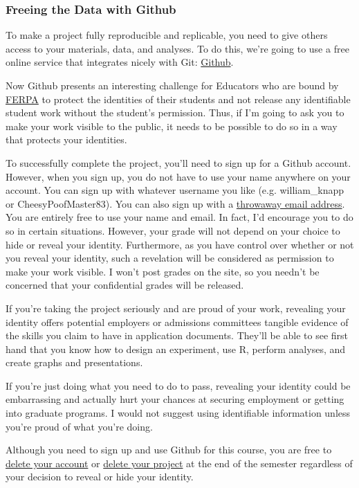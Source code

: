 \documentclass[12pt]{article}
\begin{document}
\subsubsection{Freeing the Data with Github}
To make a project fully reproducible and replicable, you need to give others access to your materials,
data, and analyses. To do this, we're going to use a free online service that integrates nicely with
Git: \href{https://github.com/}{Github}.

Now Github presents an interesting challenge for Educators who are bound by
\href{http://www2.ed.gov/policy/gen/guid/fpco/ferpa/index.html}{FERPA} to protect the identities
of their students and not release any identifiable student work without the student's permission.
Thus, if I'm going to ask you to make your work visible to the public, it needs to be possible
to do so in a way that protects your identities.

To successfully complete the project, you'll need to sign up for a Github account. However, when
you sign up, you do not have to use your name anywhere on your account. You can sign up with
whatever username you like (e.g. william\_knapp or CheesyPoofMaster83). You can also sign up with a
\href{http://www.throwawaymail.com/}{throwaway email address}. You are entirely free to use your
name and email. In fact, I'd encourage you to do so in certain situations. However, your grade
will not depend on your choice to hide or reveal your identity. Furthermore, as you have control
over whether or not you reveal your identity, such a revelation will be considered as permission
to make your work visible. I won't post grades on the site, so you needn't be concerned that
your confidential grades will be released.

If you're taking the project seriously and are proud of your work, revealing your identity offers
potential employers or admissions committees tangible evidence of the skills you
claim to have in application documents. They'll be able to see first hand that you know how to
design an experiment, use R, perform analyses, and create graphs and presentations.

If you're just doing what you need to do to pass, revealing your identity could be embarrassing
and actually hurt your chances at securing employment or getting into graduate programs.
I would not suggest using identifiable information unless you're proud of what you're doing.

Although you need to sign up and use Github for this course, you are free to
\href{https://help.github.com/articles/deleting-your-user-account/}{delete your account} or
\href{https://help.github.com/articles/deleting-a-repository/}{delete your project} at the end
of the semester regardless of your decision to reveal or hide your identity.
\end{document}
